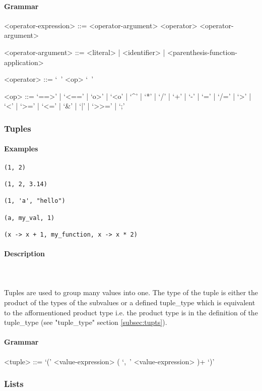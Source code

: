 \documentclass{article}
\def\pend{\mbox{} \\\\}
\begin{document}
\paragraph{Grammar}
\begin{grammar}
<operator-expression> ::= <operator-argument> <operator> <operator-argument>

<operator-argument> ::=
<literal> | <identifier> | <parenthesis-function-application>

<operator> ::= `\ ' <op> `\ '

<op> ::= 
`==>' |
`<==' |
`o>' |
`<o' |
`^' |
`*' |
`/' |
`+' |
`-' |
`=' |
`/=' |
`>' |
`<' |
`>=' |
`<=' |
`\&' |
`|' |
`>>=' |
`;'
\end{grammar}

\subsubsection{Tuples}

\paragraph{Examples}

\begin{verbatim}
(1, 2)

(1, 2, 3.14)

(1, 'a', "hello")

(a, my_val, 1)

(x -> x + 1, my_function, x -> x * 2)
\end{verbatim}

\paragraph{Description}\pend
Tuples are used to group many values into one. The type of the tuple is either 
the product of the types of the subvalues or a defined tuple\_type which is 
equivalent to the afformentioned product type i.e. the product type is in the 
definition of the tuple\_type (see "tuple\_type" section \ref{subsec:tupts}).

\paragraph{Grammar}
\begin{grammar}
<tuple> ::= `(' <value-expression> ( `,\ ' <value-expression> )+ `)'
\end{grammar}

\subsubsection{Lists}
\end{document}

